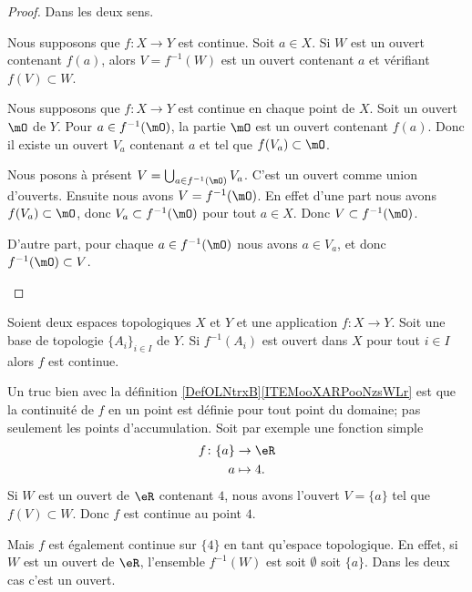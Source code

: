 \begin{proof}
	Dans les deux sens.
	\begin{subproof}
		\spitem[\( \Rightarrow\)]
		Nous supposons que \(f \colon X\to Y  \) est continue. Soit \( a\in X\). Si \( W\) est un ouvert contenant \( f(a)\), alors \( V=f^{-1}(W)\) est un ouvert contenant \( a\) et vérifiant \( f(V)\subset W\).

		\spitem[\( \Leftarrow\)]
		Nous supposons que \(f \colon X\to Y  \) est continue en chaque point de \( X\). Soit un ouvert \( \mO\) de \( Y\). Pour \( a\in f^{-1}(\mO)\), la partie \( \mO\) est un ouvert contenant \( f(a)\). Donc il existe un ouvert \( V_a\) contenant \( a\) et tel que \( f(V_a)\subset \mO\).

		Nous posons à présent \( V=\bigcup_{a\in f^{-1}(\mO)}V_a\). C'est un ouvert comme union d'ouverts. Ensuite nous avons \( V=f^{-1}(\mO)\). En effet d'une part nous avons \( f(V_a)\subset \mO\), donc \( V_a\subset f^{-1}(\mO)\) pour tout \( a\in X\).  Donc  \( V\subset f^{-1}(\mO)\).

		D'autre part, pour chaque \( a\in f^{-1}(\mO)\) nous avons \( a\in V_a\), et donc \( f^{-1}(\mO)\subset V\).
	\end{subproof}
\end{proof}

\begin{lemma}       \label{LEMooYTLSooKhetml}
	Soient deux espaces topologiques \( X\) et \( Y\) et une application \( f\colon X\to Y\). Soit une base de topologie \( \{ A_i \}_{i\in I}\) de \( Y\). Si \( f^{-1}(A_i) \) est ouvert dans \( X\) pour tout \( i\in I\) alors \( f\) est continue.
\end{lemma}

\begin{example}
	Un truc bien avec la définition \ref{DefOLNtrxB}\ref{ITEMooXARPooNzsWLr} est que la continuité de \( f\) en un point est définie pour tout point du domaine; pas seulement les points d'accumulation. Soit par exemple une fonction simple
	\begin{equation}
		\begin{aligned}
			f\colon \{a\} & \to \eR    \\
			a             & \mapsto 4.
		\end{aligned}
	\end{equation}
	Si \( W\) est un ouvert de \( \eR\) contenant \( 4\), nous avons l'ouvert \( V=\{a\}\) tel que \( f(V)\subset W\). Donc \( f\) est continue au point \( 4\).

	Mais \( f\) est également continue sur \( \{4\}\) en tant qu'espace topologique. En effet, si \( W\) est un ouvert de \( \eR\), l'ensemble \( f^{-1}(W)\) est soit \( \emptyset\) soit \( \{a\}\). Dans les deux cas c'est un ouvert.
\end{example}

